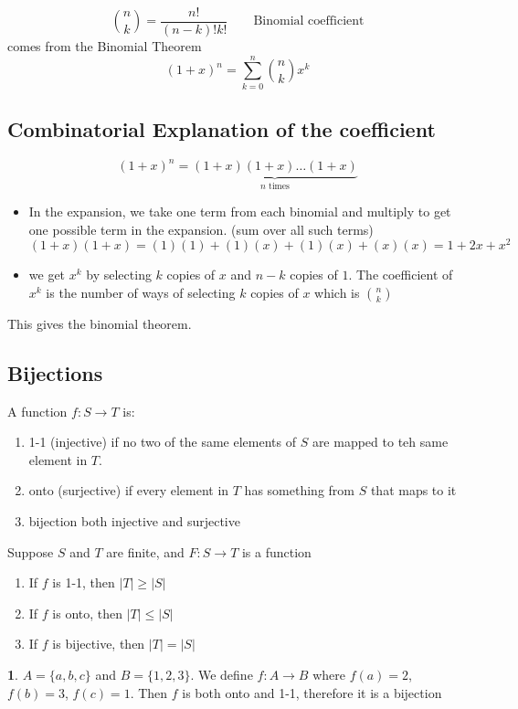 \documentclass[english,12pt]{article}
\theoremstyle{plain}
\theoremstyle{definition}
\newtheorem*{example}{\protect\examplename}
\theoremstyle{definition} %
\providecommand{\examplename}{Example}
\begin{document}
\[{n\choose k} = \frac{n!}{(n-k)!k!}\qquad \text{Binomial coefficient}\]
comes from the Binomial Theorem
\[(1+x)^n=\sum_{k=0}^n{n\choose k}x^k\]

\subsection{Combinatorial Explanation of the coefficient}
\[(1+x)^n=\underbrace{(1+x)(1+x)\ldots(1+x)}_{n\text{ times}}\]
\begin{itemize}
\item In the expansion, we take one term from each binomial and multiply to get one possible term in the expansion. (sum over all such terms)
\[(1+x)(1+x) = (1)(1) + (1)(x)+(1)(x)+(x)(x) = 1+2x+x^2\]
\item we get $x^k$ by selecting $k$ copies of $x$ and $n-k$ copies of $1$.  The coefficient of $x^k$ is the number of ways of selecting $k$ copies of $x$ which is ${n\choose k}$
\end{itemize}
This gives the binomial theorem.

\subsection{Bijections}
A function $f:S\to T$ is:
\begin{enumerate}
\item 1-1 (injective) if no two of the same elements of $S$ are mapped to teh same element in $T$.
\item onto (surjective) if every element in $T$ has something from $S$ that maps to it
\item bijection both injective and surjective 
\end{enumerate}

Suppose $S$ and $T$ are finite, and $F:S\to T$ is a function
\begin{enumerate}
\item If $f$ is 1-1, then $|T|\ge |S|$
\item If $f$ is onto, then $|T|\le |S|$
\item If $f$ is bijective, then $|T| = |S|$
\end{enumerate}

\begin{example}
$A=\{a,b,c\}$ and $B=\{1,2,3\}$.  We define $f:A\to B$ where $f(a)=2$, $f(b)=3$, $f(c)=1$.  Then $f$ is both onto and 1-1, therefore it is a bijection
\end{example}
\end{document}
